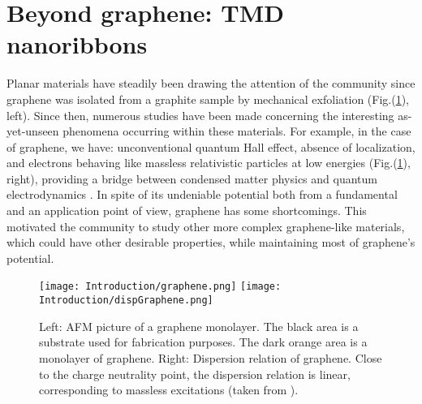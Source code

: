 \section{Beyond graphene: TMD nanoribbons}
\label{sec:state}

Planar materials have steadily been drawing the attention of the community since graphene was isolated from a graphite sample by mechanical exfoliation \cite{novoselov_electric_2004}(Fig.(\ref{fig:graphene}), left).
Since then, numerous studies have been made concerning the interesting as-yet-unseen phenomena occurring within these materials. For example, in the case of graphene, we have: unconventional quantum Hall effect, absence of localization, and electrons behaving like massless relativistic particles at low energies (Fig.(\ref{fig:graphene}), right), providing a bridge between condensed matter physics and quantum electrodynamics \cite{katsnelson_graphene:_2007}.
In spite of its undeniable potential both from a fundamental and an application point of view, graphene has some shortcomings.
This motivated the community to study other more complex graphene-like materials, which could have other desirable properties, while maintaining most of graphene's potential.
\begin{figure}[H]
\hspace{2.5cm}
\texttt{[image: Introduction/graphene.png]}
\hspace{3.5cm}
\texttt{[image: Introduction/dispGraphene.png]}
\caption[Graphene monolayer; graphene's dispersion relation.]{Left: \acf{AFM} picture of a graphene monolayer. The black area is a substrate used for fabrication purposes. The dark orange area is a monolayer of graphene. Right: Dispersion relation of graphene.
Close to the charge neutrality point, the dispersion relation is linear, corresponding to massless excitations (taken from \cite{castro_neto_electronic_2009}). }
\label{fig:graphene}
\end{figure}	

